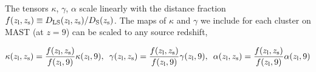 %
%
%
%
%
%
%

\noindent The tensors $\kappa$, $\gamma$, $\alpha$ scale linearly with the distance fraction $f(z_\mathrm{l},z_\mathrm{s})\equiv D_\mathrm{LS}(z_\mathrm{l},z_\mathrm{s})/D_\mathrm{S}(z_\mathrm{s})$. The maps of $\kappa$ and $\gamma$ we include for each cluster on MAST (at $z=9$) can be scaled to any source redshift,

\begin{equation}
\kappa(z_\mathrm{l},z_\mathrm{s}) = \frac{f(z_\mathrm{l},z_\mathrm{s})}{f(z_\mathrm{l},9)}\kappa(z_\mathrm{l},9), \hspace{5pt} \gamma(z_\mathrm{l},z_\mathrm{s}) = \frac{f(z_\mathrm{l},z_\mathrm{s})}{f(z_\mathrm{l},9)}\gamma(z_\mathrm{l},9), \hspace{5pt} \alpha(z_\mathrm{l},z_\mathrm{s}) = \frac{f(z_\mathrm{l},z_\mathrm{s})}{f(z_\mathrm{l},9)}\alpha(z_\mathrm{l},9)
\end{equation}

